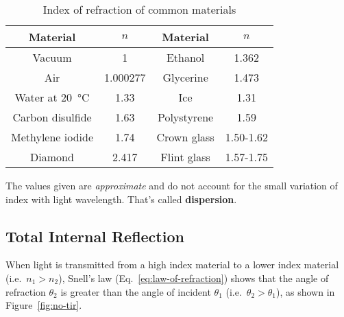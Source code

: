 \begin{table}[ht]
  \centering
  \begin{tabular}{c|c||c|c}
    \rowcolor{pink}
    \textbf{Material} & $n$ & \textbf{Material} & $n$\\ \hline
    Vacuum           & 1        & Ethanol     & 1.362 \\
    Air              & 1.000277 & Glycerine   & 1.473 \\
    Water at \SI{20}\celsius & 1.33 & Ice  & 1.31 \\
    Carbon disulfide & 1.63     & Polystyrene & 1.59 \\
    Methylene iodide & 1.74     & Crown glass & 1.50-1.62\\
    Diamond          & 2.417    & Flint glass & 1.57-1.75\\
  \end{tabular}
  \caption{Index of refraction of common materials}
\end{table}
The values given are \emph{approximate} and do not account for the small
variation of index with light wavelength. That's called \textbf{dispersion}.


\subsection{Total Internal Reflection}
When light is transmitted from a high index material to a lower index material
(i.e.\ $n_1>n_2$), Snell's law (Eq.~\ref{eq:law-of-refraction}) shows that the
angle of refraction $\theta_2$ is greater than the angle of incident $\theta_1$
(i.e.\ $\theta_2>\theta_1$), as shown in Figure~\ref{fig:no-tir}.

